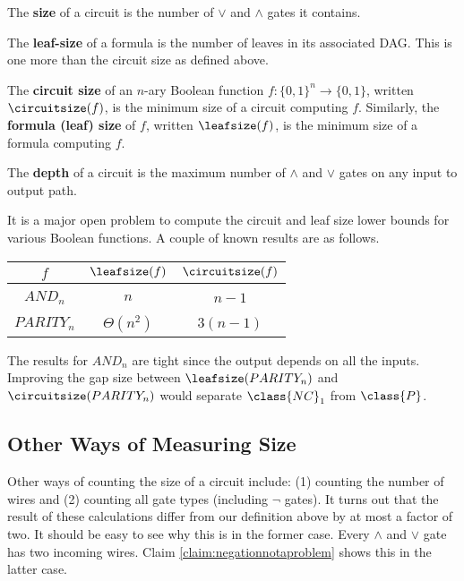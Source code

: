 	\begin{definition}
		\label{def:circuitsize}
		The \textbf{size} of a circuit is the number of $\lor$ and $\land$ gates it contains. 
		
		The \textbf{leaf-size} of a formula is the number of leaves in its associated DAG. This is one more than the circuit size as defined above. 
		
		The \textbf{circuit size} of an $n$-ary Boolean function $f: \{0,1\}^n \rightarrow \{0,1\}$, written $\circuitsize(f)$, is the minimum size of a circuit computing $f$. Similarly, the \textbf{formula (leaf) size} of $f$, written $\leafsize(f)$, is the minimum size of a formula computing $f$. 
		
		The \textbf{depth} of a circuit is the maximum number of $\land$ and $\lor$ gates on any input to output path.
	\end{definition}
	
	\begin{example}
		It is a major open problem to compute the circuit and leaf size lower bounds for various Boolean functions. A couple of known results are as follows.
		\begin{center}
			\begin{tabular}{c|c|c}
				$f$ 		& $\leafsize(f)$ 	& $\circuitsize(f)$\\ \hline
				&&\\[-1em]
				$AND_n$ 	& $n$ 				& $n-1$\\ \hline
				&&\\[-1em]
				$PARITY_n$ 	& $\Theta\left(n^2\right)$ 	& $3(n-1)$\\
			\end{tabular}
		\end{center}
		The results for $AND_n$ are tight since the output depends on all the inputs. Improving the gap size between $\leafsize(PARITY_n)$ and $\circuitsize(PARITY_n)$ would separate $\class{NC}_1$ from $\class{P}$.
	\end{example}

	\subsection{Other Ways of Measuring Size}
	Other ways of counting the size of a circuit include: (1) counting the number of wires and (2) counting all gate types (including $\lnot$ gates). It turns out that the result of these calculations differ from our definition above by at most a factor of two. It should be easy to see why this is in the former case. Every $\land$ and $\lor$ gate has two incoming wires. Claim \ref{claim:negationnotaproblem} shows this in the latter case.
	
